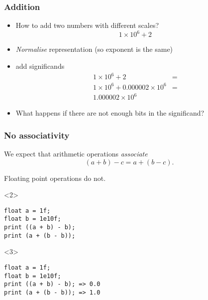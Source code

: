 \documentclass[presentation]{beamer}
\begin{document}
\begin{frame}
  \frametitle{Addition}
  \begin{itemize}
  \item How to add two numbers with different scales?
    \begin{equation*}
      1 \times 10^{6} + 2
    \end{equation*}
  \item \emph{Normalise} representation (so exponent is the same)
  \item add significands
    \begin{align*}
      1 \times 10^{6} + 2 &= \\
      1 \times 10^{6} + 0.000002 \times 10^{6} &= \\
      1.000002 \times 10^{6}
    \end{align*}
  \item What happens if there are not enough bits in the significand?
  \end{itemize}
\end{frame}

\begin{frame}[fragile]
  \frametitle{No associativity}
  We expect that arithmetic operations \emph{associate}
  \begin{equation*}
    (a + b) - c = a + (b - c).
  \end{equation*}

  Floating point operations do not.

  \begin{center}
    \begin{onlyenv}<2>
\begin{verbatim}
float a = 1f;
float b = 1e10f;
print ((a + b) - b);
print (a + (b - b));
\end{verbatim}
    \end{onlyenv}
  \end{center}
  \begin{center}
    \begin{onlyenv}<3>
\begin{verbatim}
float a = 1f;
float b = 1e10f;
print ((a + b) - b); => 0.0
print (a + (b - b)); => 1.0
\end{verbatim}
    \end{onlyenv}
  \end{center}
\end{frame}
\end{document}
